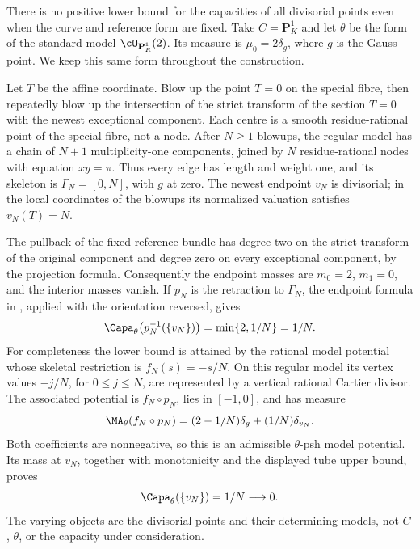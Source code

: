 \begin{example}
\label{ex:ch25-fixed-reference-small-capacities}
There is no positive lower bound for the capacities of all divisorial
points even when the curve and reference form are fixed.  Take
\(C=\mathbf P^1_K\) and let \(\theta\) be the form of the standard
model \(\cO_{\mathbf P^1_R}(2)\).  Its measure is
\(\mu_0=2\delta_g\), where \(g\) is the Gauss point.  We keep this same
form throughout the construction.

Let \(T\) be the affine coordinate.  Blow up the point \(T=0\) on the
special fibre, then repeatedly blow up the intersection of the strict
transform of the section \(T=0\) with the newest exceptional component.
Each centre is a smooth residue-rational point of the special fibre, not
a node.  After \(N\geq1\) blowups, the regular model has a chain of
\(N+1\) multiplicity-one components, joined by \(N\) residue-rational
nodes with equation \(xy=\pi\).  Thus every edge has length and weight
one, and its skeleton is \(\Gamma_N=[0,N]\), with \(g\) at zero.
The newest endpoint \(v_N\) is divisorial; in the local coordinates of
the blowups its normalized valuation satisfies \(v_N(T)=N\).

The pullback of the fixed reference bundle has degree two on the strict
transform of the original component and degree zero on every exceptional
component, by the projection formula.  Consequently the endpoint masses
are \(m_0=2\), \(m_1=0\), and the interior masses vanish.  If \(p_N\)
is the retraction to \(\Gamma_N\), the endpoint formula in
, applied with the orientation
reversed, gives
\[
 \Capa_\theta\bigl(p_N^{-1}(\{v_N\})\bigr)
                 =\min\{2,1/N\}=1/N.
\]
For completeness the lower bound is attained by the rational model
potential whose skeletal restriction is \(f_N(s)=-s/N\).  On this
regular model its vertex values \(-j/N\), for \(0\leq j\leq N\),
are represented by a vertical rational Cartier divisor.  The associated
potential is \(f_N\circ p_N\), lies in \([-1,0]\), and has measure
\[
 \MA_\theta(f_N\circ p_N)
       =(2-1/N)\delta_g+(1/N)\delta_{v_N}.
\]
Both coefficients are nonnegative, so this is an admissible
\(\theta\)-psh model potential.  Its mass at \(v_N\), together with
monotonicity and the displayed tube upper bound, proves
\[
          \Capa_\theta(\{v_N\})=1/N\longrightarrow0.
\]
The varying objects are the divisorial points and their determining
models, not \(C\), \(\theta\), or the capacity under consideration.
\end{example}
